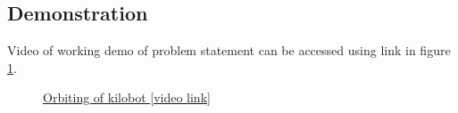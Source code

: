 \documentclass{report}[12pt]
\begin{document}
\subsection{Demonstration}
Video of working demo of problem statement can be accessed using link in figure \ref{fig:orbit}.
\begin{figure}[H]
	\centering
	\caption{\href{https://photos.app.goo.gl/xPYoywncwhCk585X8}{Orbiting of kilobot [video link]}}
	\label{fig:orbit}
\end{figure}
\end{document}
